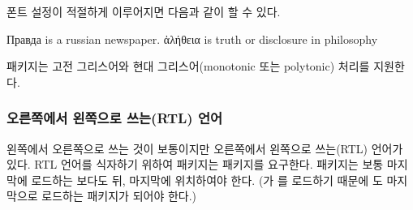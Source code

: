 폰트 설정이 적절하게 이루어지면 다음과 같이 할 수 있다.

{\setmonofont{cmuntt.otf}
\begin{example}
\textrussian{Правда} is
a russian newspaper.
\textgreek{ἀλήθεια} is truth
or disclosure in philosophy
\end{example}
}

 패키지\cite{xgreek}는 고전 그리스어와 현대 그리스어(monotonic 또는 polytonic)
처리를 지원한다.

\subsubsection{오른쪽에서 왼쪽으로 쓰는(RTL) 언어}

왼쪽에서 오른쪽으로 쓰는 것이 보통이지만 오른쪽에서 왼쪽으로 쓰는(RTL) 언어가 있다.
RTL 언어를 식자하기 위하여  패키지는  패키지를 요구한다. %
 패키지는 보통 마지막에 로드하는 보다도 뒤, 마지막에 위치하여야 한다. 
(가 를 로드하기 때문에 도 마지막으로 로드하는 패키지가 되어야 한다.)

